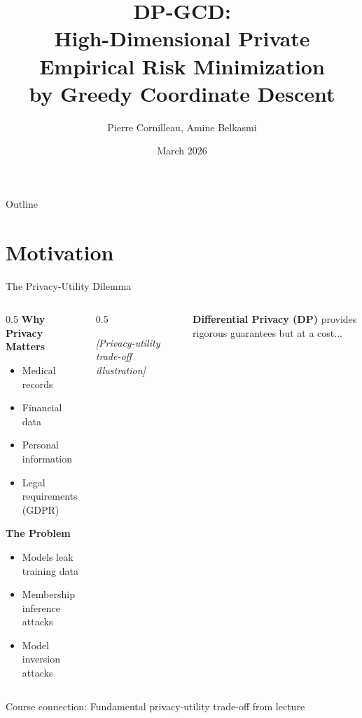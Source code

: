 \documentclass{beamer}
\title{DP-GCD:\\High-Dimensional Private Empirical Risk Minimization\\by Greedy Coordinate Descent}
\author{Pierre Cornilleau, Amine Belkasmi}
\institute{Differential Privacy in ML project}
\date{March 2026}
\begin{document}
\frame{\titlepage}

\begin{frame}{Outline}
\tableofcontents
\end{frame}

\section{Motivation}

\begin{frame}{The Privacy-Utility Dilemma}
\begin{columns}[T]
\begin{column}{0.5\textwidth}
\textbf{Why Privacy Matters}
\begin{itemize}
\item Medical records
\item Financial data
\item Personal information
\item Legal requirements (GDPR)
\end{itemize}

\vspace{1em}

\textbf{The Problem}
\begin{itemize}
\item Models leak training data
\item Membership inference attacks
\item Model inversion attacks
\end{itemize}
\end{column}

\begin{column}{0.5\textwidth}
\begin{center}
\textit{[Privacy-utility trade-off illustration]}
\end{center}
\end{column}

\vspace{0.5em}

\textbf{Differential Privacy (DP)} provides rigorous guarantees but at a cost...
\end{columns}

\vspace{0.5em}

\alert{Course connection:} Fundamental privacy-utility trade-off from lecture
\end{frame}
\end{document}
